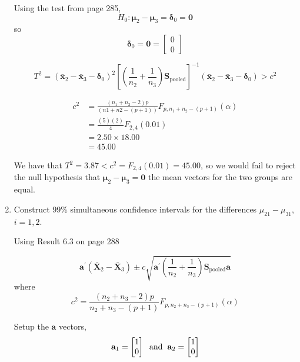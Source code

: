 \begin{enumerate}[label= (\alph*)]
    Using the test from page 285,
    \[
        H_{0}: \bm{\mu}_{2} - \bm{\mu}_{3} = \bm{\delta}_{0} = \textbf{0}
    \]
so
    \[
        \bm{\delta}_{0}
        =
        \textbf{0}
        =
        \left[
            \begin{array}{cc}
                0 \\
                0
            \end{array}
        \right]
    \]

    \[
        T^{2}
        =
        {(\bar{\textbf{x}}_{2} - \bar{\textbf{x}}_{3} - \bm{\delta}_{0})}^{2}
        {\left[
            \left(
                \frac{1}{n_{2}}
                +
                \frac{1}{n_{3}}
            \right)
            \textbf{S}_{\text{pooled}}
        \right]}^{-1}
        (\bar{\textbf{x}}_{2} - \bar{\textbf{x}}_{3} - \bm{\delta}_{0})
        > c^{2}
    \]

    \begin{align*}
        c^{2}
        &=
        \frac{(n_{1} + n_{2}  - 2)p}{(n1 + n2 - (p + 1))}
        F_{p, n_{1} + n_{2} - (p+1)}(\alpha) \\
        &=
        \frac{(5)(2)}{4}
        F_{2, 4}(0.01) \\
        &=
        2.50 \times 18.00 \\
        &=
        45.00
    \end{align*}

    We have that $T^{2} = 3.87 < c^{2} = F_{2,4}(0.01)=45.00$, so we would fail to reject the null hypothesis that $\bm{\mu}_{2} - \bm{\mu}_{3} = \textbf{0}$ the mean vectors for the two groups are equal.

    \item Construct 99\% simultaneous confidence intervals for the differences $\mu_{21} - \mu_{31}$,
    $i = 1, 2$.

    Using Result 6.3 on page 288

    \[
        \textbf{a}^{\prime}
        {(\bar{\textbf{X}}_{2} - \bar{\textbf{X}}_{3})}
        \pm
        c
        \sqrt{
            \textbf{a}^{\prime}
            \left(
                \frac{1}{n_{2}}
                +
                \frac{1}{n_{3}}
            \right)
            \textbf{S}_{\text{pooled}}
            \textbf{a}
        }
    \]
    where
    \[
        c^{2}
        =
        \frac{(n_{2} + n_{3} - 2)p}{n_{2} + n_{3} - (p + 1)}
        F_{p, n_{2} + n_{3} - (p + 1)}
        (\alpha)
    \]

    Setup the $\textbf{a}$ vectors,
    \[
        \textbf{a}_{1}
        =
        \begin{bmatrix}
            1 \\
            0
        \end{bmatrix}
        \hspace{0.2cm}
        \text{and}
        \hspace{0.2cm}
        \textbf{a}_{2}
        =
        \begin{bmatrix}
            1 \\
            0
        \end{bmatrix}
    \]


\end{enumerate}
